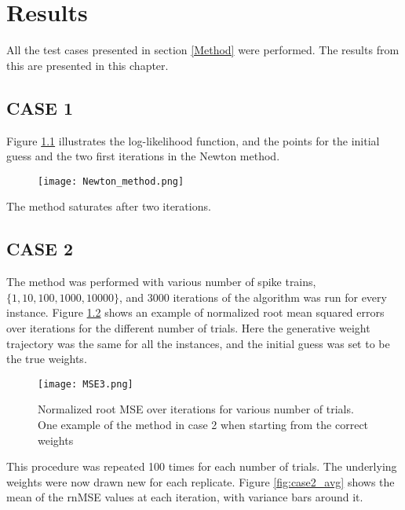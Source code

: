 
\chapter{Results}

All the test cases presented in section \ref{Method} were performed. The results from this are presented in this chapter.

\section{CASE 1}
Figure \ref{fig:Newton} illustrates the log-likelihood function, and the points for the initial guess and the two first iterations in the Newton method.


\begin{figure}[hbt!]
\caption{}
\label{fig:Newton}
    \centering
    \texttt{[image: Newton\_method.png]}
\end{figure}

The method saturates after two iterations. 

\section{CASE 2}
 
The method was performed with various number of spike trains, $ \{1,10,100,1000,10000 \}$, and 3000 iterations of the algorithm was run for every instance. Figure \ref{fig:Case2_1} shows an example of normalized root mean squared errors over iterations for the different number of trials. Here the generative weight trajectory was the same for all the instances, and the initial guess was set to be the true weights. 


\begin{figure}[hbt!]
\caption{Normalized root MSE over iterations for various number of trials. One example of the method in case 2 when starting from the correct weights}
\label{fig:Case2_1}
    \centering
    \texttt{[image: MSE3.png]}
\end{figure}

This procedure was repeated 100 times for each number of trials. The underlying weights were now drawn new for each replicate. Figure \ref{fig:case2_avg} shows the mean of the rnMSE values at each iteration, with variance bars around it. 

